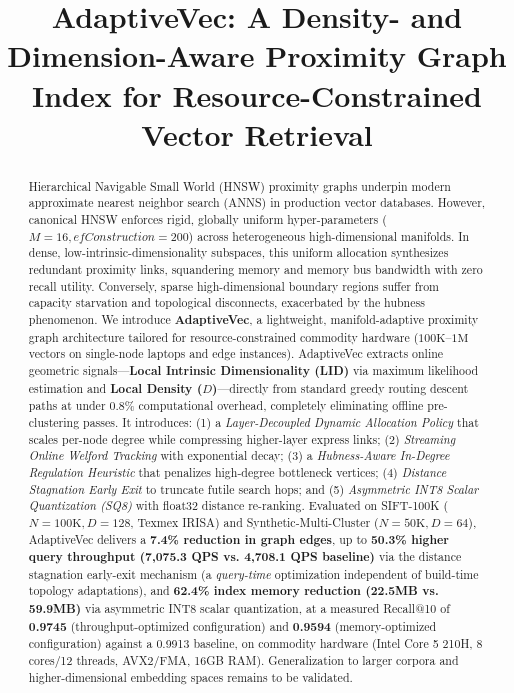 \documentclass[conference,10pt]{IEEEtran}
\begin{document}
\title{AdaptiveVec: A Density- and Dimension-Aware Proximity Graph Index for Resource-Constrained Vector Retrieval}

\author{
}

\maketitle

\begin{abstract}
Hierarchical Navigable Small World (HNSW) proximity graphs underpin modern approximate nearest neighbor search (ANNS) in production vector databases. However, canonical HNSW enforces rigid, globally uniform hyper-parameters ($M=16, efConstruction=200$) across heterogeneous high-dimensional manifolds. In dense, low-intrinsic-dimensionality subspaces, this uniform allocation synthesizes redundant proximity links, squandering memory and memory bus bandwidth with zero recall utility. Conversely, sparse high-dimensional boundary regions suffer from capacity starvation and topological disconnects, exacerbated by the hubness phenomenon. We introduce \textbf{AdaptiveVec}, a lightweight, manifold-adaptive proximity graph architecture tailored for resource-constrained commodity hardware ($100\text{K}$--$1\text{M}$ vectors on single-node laptops and edge instances). AdaptiveVec extracts online geometric signals---\textbf{Local Intrinsic Dimensionality (LID)} via maximum likelihood estimation and \textbf{Local Density ($D$)}---directly from standard greedy routing descent paths at under $0.8\%$ computational overhead, completely eliminating offline pre-clustering passes. It introduces: (1) a \textit{Layer-Decoupled Dynamic Allocation Policy} that scales per-node degree while compressing higher-layer express links; (2) \textit{Streaming Online Welford Tracking} with exponential decay; (3) a \textit{Hubness-Aware In-Degree Regulation Heuristic} that penalizes high-degree bottleneck vertices; (4) \textit{Distance Stagnation Early Exit} to truncate futile search hops; and (5) \textit{Asymmetric INT8 Scalar Quantization (SQ8)} with float32 distance re-ranking. Evaluated on SIFT-100K ($N=100\text{K}, D=128$, Texmex IRISA) and Synthetic-Multi-Cluster ($N=50\text{K}, D=64$), AdaptiveVec delivers a \textbf{7.4\% reduction in graph edges}, up to \textbf{50.3\% higher query throughput (7,075.3 QPS vs. 4,708.1 QPS baseline)} via the distance stagnation early-exit mechanism (a \textit{query-time} optimization independent of build-time topology adaptations), and \textbf{62.4\% index memory reduction (22.5MB vs. 59.9MB)} via asymmetric INT8 scalar quantization, at a measured Recall@10 of \textbf{0.9745} (throughput-optimized configuration) and \textbf{0.9594} (memory-optimized configuration) against a 0.9913 baseline, on commodity hardware (Intel Core 5 210H, 8 cores/12 threads, AVX2/FMA, 16GB RAM). Generalization to larger corpora and higher-dimensional embedding spaces remains to be validated.

\end{abstract}
\end{document}
